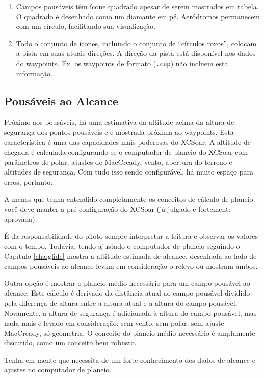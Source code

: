 \begin{enumerate}
\item  Campos pousáveis têm ícone quadrado apesar de serem mostrados em tabela.  O quadrado é desenhado como um diamante em pé.  Aeródromos permanecem com um círculo, facilitando sua visualização. 
\item  Todo o conjunto de ícones, incluindo o conjunto de “círculos roxos”, colocam a pista em suas atuais direções.  A direção da pista está disponível nos dados do waypoints.  Ex. os waypoints de formato (\verb|.cup|) não incluem esta informação.
\end{enumerate}

\subsection*{Pousáveis ao Alcance}
Próximo aos pousáveis, há uma estimativa da altitude acima da altura de segurança dos pontos pousáveis e é mostrada próxima ao waypoints.  Esta característica é uma das capacidades mais poderosas do XCSoar.  A altitude de chegada é calculada configurando-se o computador de planeio do XCSoar com parâmetros de polar, ajustes de MacCready, vento, abertura do terreno e altitudes de segurança.  Com tudo isso sendo configurável, há muito espaço para erros, portanto:

A menos que tenha entendido completamente os conceitos de cálculo de planeio, você deve \warning manter a pré-configuração do XCSoar (já julgado e fortemente aprovada).

É da responsabilidade do piloto sempre interpretar a leitura e observar os valores com o tempo.  Todavia, tendo ajustado o computador de planeio seguindo o Capítulo 
\ref{cha:glide} mostra a altitude estimada de alcance, desenhada ao lado de campos pousáveis ao alcance levam em consideração o relevo ou mostram ambos.

Outra opção é mostrar o planeio médio necessário para um campo pousável ao alcance.  Este cálculo é derivado da distância atual ao campo pousável dividido pela diferença de altura entre a altura atual e a altura do campo pousável.  Novamente, a altura de segurança é adicionada à altura do campo pousável, mas nada mais é levado em consideração: sem vento, sem polar, sem ajuste MacCready, só geometria.  O conceito do planeio médio necessário é amplamente discutido, como um conceito bem robusto.

\tip Tenha em mente que necessita de um forte conhecimento dos dados de alcance e ajustes no computador de planeio.

